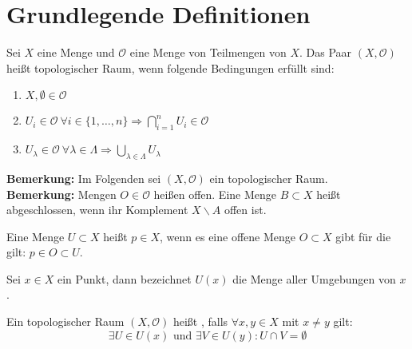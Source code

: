 \chapter{Grundlegende Definitionen}

\begin{Def}
	Sei \(X\) eine Menge und \( \mathcal{O} \) eine Menge von Teilmengen von \(X\). Das Paar \((X,\mathcal{O})\) heißt topologischer Raum, wenn folgende Bedingungen erfüllt sind:
	\begin{enumerate}
		\item \( X, \emptyset \in \mathcal{O} \) 
		\item \( U_{i} \in \mathcal{O} \ \forall  i \in \{1, \dots, n\} 
			\Rightarrow \bigcap_{i=1}^n U_{i} \in  \mathcal{O} \)
		\item \( U_{\lambda} \in \mathcal{O} \ \forall \lambda \in \Lambda \Rightarrow \bigcup_{\lambda \in \Lambda} U_{\lambda} \)
	\end{enumerate}
\end{Def}
\textbf{Bemerkung:} Im Folgenden sei \((X,\mathcal{O})\) ein topologischer Raum.
\\
\textbf{Bemerkung:} Mengen \(O \in \mathcal{O} \) heißen offen. Eine Menge \(B \subset X\) heißt abgeschlossen, wenn ihr Komplement \( X \backslash A\) offen ist.

\begin{Def} 
	Eine Menge \(U \subset X\) heißt  \(p \in X\), wenn es eine offene Menge \(O \subset X\) gibt für die gilt: 
	\(p \in O \subset U\).
\end{Def}

\begin{Def}
	Sei \(x \in X\) ein Punkt, dann bezeichnet \(U(x)\) die Menge aller Umgebungen von \(x\). 
\end{Def}

\begin{Def}[hausdorffsch]
	Ein topologischer Raum \((X,\mathcal{O})\) heißt , falls \( \forall x,y \in X\) mit \(x\ne y\) gilt:
	\[\exists U \in U(x) \mbox{ und } \exists V \in U(y) : U \cap V = \emptyset \]
\end{Def}

